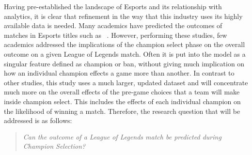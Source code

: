 Having pre-established the landscape of Esports and its relationship with analytics, it is clear that refinement in the way that this industry uses its highly available data is needed.
Many academics have predicted the outcomes of matches in Esports titles such as ~\citet{silva2018continuous}.
However, performing these studies, few academics addressed the implications of the champion select phase on the overall outcome on a given League of Legends match.
Often it is put into the model as a singular feature defined as champion or ban, without giving much implication on how an individual champion effects a game more than another.
In contrast to other studies, this study uses a much larger, updated dataset and will concentrate much more on the overall effects of the pre-game choices that a team will make inside champion select.
This includes the effects of each individual champion on the likelihood of winning a match.
Therefore, the research question that will be addressed is as follows:\\

\begin{quote}  \emph{Can the outcome of a League of Legends match be predicted during Champion Selection?} \end{quote}